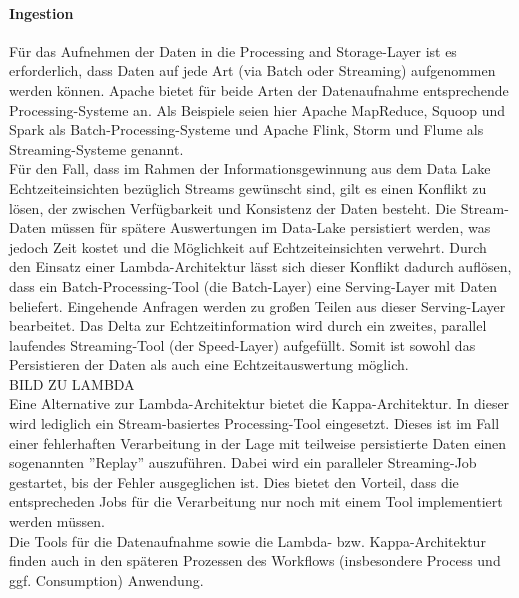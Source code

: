 \documentclass[twoside,twocolumn]{article}
\begin{document}
\paragraph{Ingestion}
		Für das Aufnehmen der Daten in die Processing and Storage-Layer ist es erforderlich, dass Daten auf jede Art (via Batch oder Streaming) aufgenommen werden können. Apache bietet für beide Arten der Datenaufnahme entsprechende Processing-Systeme an. Als Beispiele seien hier Apache MapReduce, Squoop und Spark als Batch-Processing-Systeme und Apache Flink, Storm und Flume als Streaming-Systeme genannt.\cite{src8}\\
		Für den Fall, dass im Rahmen der Informationsgewinnung aus dem Data Lake Echtzeiteinsichten bezüglich Streams gewünscht sind, gilt es einen Konflikt zu lösen, der zwischen Verfügbarkeit und Konsistenz der Daten besteht. Die Stream-Daten müssen für spätere Auswertungen im Data-Lake persistiert werden, was jedoch Zeit kostet und die Möglichkeit auf Echtzeiteinsichten verwehrt. Durch den Einsatz einer Lambda-Architektur lässt sich dieser Konflikt dadurch auflösen, dass ein Batch-Processing-Tool (die Batch-Layer) eine Serving-Layer mit Daten beliefert. Eingehende Anfragen werden zu großen Teilen aus dieser Serving-Layer bearbeitet. Das Delta zur Echtzeitinformation wird durch ein zweites, parallel laufendes Streaming-Tool (der Speed-Layer) aufgefüllt. Somit ist sowohl das Persistieren der Daten als auch eine Echtzeitauswertung möglich. \cite{src10} \\
		
		BILD ZU LAMBDA\\
		
		Eine Alternative zur Lambda-Architektur bietet die Kappa-Architektur. In dieser wird lediglich ein Stream-basiertes Processing-Tool eingesetzt. Dieses ist im Fall einer fehlerhaften Verarbeitung in der Lage mit teilweise persistierte Daten einen sogenannten ''Replay'' auszuführen. Dabei wird ein paralleler Streaming-Job gestartet, bis der Fehler ausgeglichen ist. Dies bietet den Vorteil, dass die entsprecheden Jobs für die Verarbeitung nur noch mit einem Tool implementiert werden müssen.\cite{src11} \\
		Die Tools für die Datenaufnahme sowie die Lambda- bzw. Kappa-Architektur finden auch in den späteren Prozessen des Workflows (insbesondere Process und ggf. Consumption) Anwendung.
		
\end{document}
